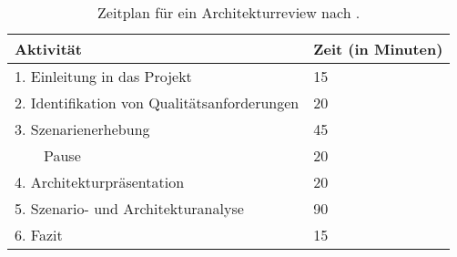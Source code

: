 \begin{table}[!h]
  \centering
  \begin{tabular}{l l}
    \toprule
    \textbf{Aktivität} & \textbf{Zeit (in Minuten)} \\ \midrule
    1. Einleitung in das Projekt & 15 \\
    2. Identifikation von Qualitätsanforderungen & 20 \\
    3. Szenarienerhebung & 45 \\
    ~~~~Pause & 20 \\
    4. Architekturpräsentation & 20 \\
    5. Szenario- und Architekturanalyse & 90 \\
    6. Fazit & 15 \\
    \bottomrule
  \end{tabular}
  \caption[Zeitplan für ein Architekturreview nach \citeauthor{SVAHNBERG20071893}]{
    Zeitplan für ein Architekturreview nach .
  }
  \label{tab:svahnberg-plan}
\end{table}
